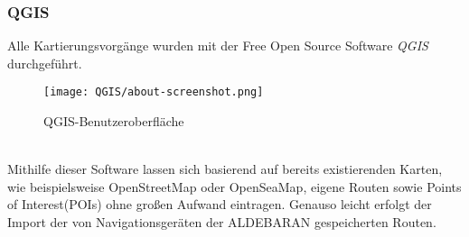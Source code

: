 \subsubsection*{QGIS}
Alle Kartierungsvorgänge wurden mit der Free Open Source Software \emph{QGIS}\cite{qgis} durchgeführt.
\begin{figure}[ht]
    \centering
    \texttt{[image: QGIS/about-screenshot.png]}
    \caption[fig:qgisabout]{QGIS-Benutzeroberfläche}
\end{figure}
\\Mithilfe dieser Software lassen sich basierend auf bereits existierenden Karten, 
wie beispielsweise OpenStreetMap\cite{ostrm} oder OpenSeaMap\cite{oseam}, eigene Routen sowie
Points of Interest(POIs) ohne großen Aufwand eintragen. Genauso leicht erfolgt der Import der von 
Navigationsgeräten der ALDEBARAN gespeicherten Routen. 




